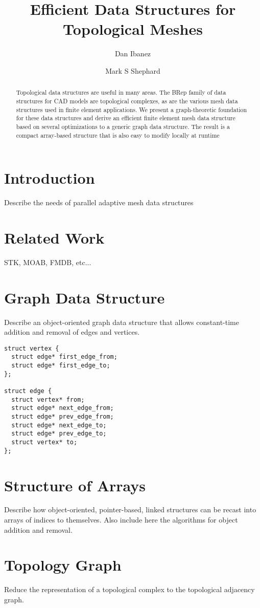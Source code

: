 \documentclass{article}
\title{Efficient Data Structures for Topological Meshes}
\author{Dan Ibanez \and Mark S Shephard}
\begin{document}
\maketitle
\begin{abstract}
Topological data structures are useful in many areas.
The BRep family of data structures for CAD models
are topological complexes,
as are the various mesh data structures used in
finite element applications.
We present a graph-theoretic foundation for
these data structures and derive an efficient
finite element
mesh data structure based on several optimizations
to a generic graph data structure.
The result is a compact array-based structure that is also
easy to modify locally at runtime
\end{abstract}

\section{Introduction}
Describe the needs of parallel adaptive mesh data structures

\section{Related Work}
STK, MOAB, FMDB, etc...

\section{Graph Data Structure}
Describe an object-oriented graph data structure that allows
constant-time addition and removal of edges and vertices.

\begin{verbatim}
struct vertex {
  struct edge* first_edge_from;
  struct edge* first_edge_to;
};

struct edge {
  struct vertex* from;
  struct edge* next_edge_from;
  struct edge* prev_edge_from;
  struct edge* next_edge_to;
  struct edge* prev_edge_to;
  struct vertex* to;
};
\end{verbatim}

\section{Structure of Arrays}
Describe how object-oriented, pointer-based, linked structures
can be recast into arrays of indices to themselves.
Also include here the algorithms for object addition and removal.

\section{Topology Graph}
Reduce the representation of a topological complex
to the topological adjacency graph.
\end{document}
